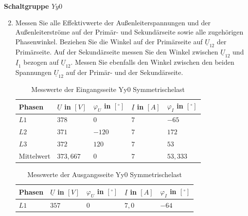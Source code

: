 \pagebreak
\textbf{Schaltgruppe $Yy0$}
\begin{enumerate}[label=\alph*)]
  \setcounter{enumi}{1}
  \item Messen Sie alle Effektivwerte der Außenleiterspannungen und der
        Außenleiterströme auf der Primär- und Sekundärseite sowie alle zugehörigen
        Phasenwinkel. Beziehen Sie die Winkel auf der Primärseite auf $\underline
          U_{12}$ der Primärseite. Auf der Sekundärseite messen Sie den Winkel zwischen
        $\underline U_{12}$ und $\underline I_1$ bezogen auf $\underline U_{12}$.
        Messen Sie ebenfalls den Winkel zwischen den beiden Spannungen $\underline
          U_{12}$ auf der Primär- und der Sekundärseite.

        \begin{table}[h!]
          \caption{Messwerte der Eingangsseite Yy0 Symmetrischelast}
          \centering
          \begin{tabular}{lllll}
            \\ \hline
            Phasen     & $\underline{U}$ in $[V]$ & $\varphi_{U}$ in $[^\circ]$ & $\underline{I}$ in $[A]$ & $\varphi_{I}$ in $[^\circ]$ \\ \hline
            $L1$       & $378$                    & $0$                         & $7$                      & $-65$                       \\
            $L2$       & $371$                    & $-120$                      & $7$                      & $172$                       \\
            $L3$       & $372$                    & $120$                       & $7$                      & $53$                        \\ \hline
            Mittelwert & $373,667$                & $0$                         & $7$                      & $53,333$                    \\ \hline\hline
          \end{tabular}
        \end{table}
        \begin{table}[h!]
          \centering
          \caption{Messwerte der Ausgangsseite Yy0 Symmetrischelast}
          \begin{tabular}{lllll}
            \\ \hline
            Phasen     & $\underline{U}$ in $[V]$ & $\varphi_{U}$ in $[^\circ]$ & $\underline{I}$ in $[A]$ & $\varphi_{I}$ in $[^\circ]$ \\ \hline
            $L1$       & $357$                    & $0$                         & $7,0$                    & $-64$                       \\

\end{tabular}
\end{table}
\end{enumerate}
